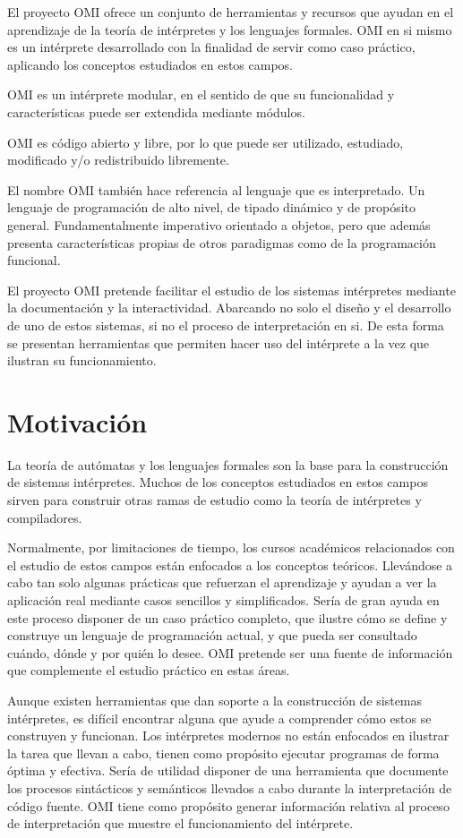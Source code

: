 El proyecto OMI ofrece un conjunto de herramientas y recursos que ayudan en el aprendizaje 
de la teoría de intérpretes y los lenguajes formales. OMI en si mismo es un intérprete desarrollado 
con la finalidad de servir como caso práctico, aplicando los conceptos estudiados en 
estos campos. 

OMI es un intérprete modular, en el sentido de que su funcionalidad y características puede ser extendida mediante módulos. 

OMI es código abierto y libre, por lo que puede ser utilizado, estudiado, modificado y/o redistribuido libremente.

El nombre OMI también hace referencia al lenguaje que es interpretado. Un lenguaje de programación de alto nivel, de tipado dinámico y de propósito general. Fundamentalmente 
imperativo orientado a objetos, pero que además presenta características propias de otros paradigmas como de la programación funcional. 

El proyecto OMI pretende facilitar el estudio de los sistemas intérpretes mediante la documentación y la interactividad. Abarcando no solo el diseño y el desarrollo
de uno de estos sistemas, si no el proceso de interpretación en si. De esta forma se presentan herramientas que permiten hacer uso del intérprete a la vez que ilustran
su funcionamiento. 

\section{Motivación}
La teoría de autómatas y los lenguajes formales son la base para la construcción de sistemas intérpretes. Muchos de los conceptos estudiados 
en estos campos sirven para construir otras ramas de estudio como la teoría de intérpretes y compiladores. 

Normalmente, por limitaciones de tiempo, los cursos académicos relacionados con el estudio de estos campos están enfocados a los conceptos teóricos. 
Llevándose a cabo tan solo algunas prácticas que refuerzan el aprendizaje y ayudan a ver la aplicación real mediante casos sencillos y simplificados. 
Sería de gran ayuda en este proceso disponer de un caso práctico completo, que ilustre cómo se define y construye un lenguaje de programación actual, 
y que pueda ser consultado cuándo, dónde y por quién lo desee. OMI pretende ser una fuente de información que complemente el estudio práctico en estas áreas.

Aunque existen herramientas que dan soporte a la construcción de sistemas intérpretes, es difícil encontrar alguna que ayude a comprender cómo estos se construyen y funcionan. 
Los intérpretes modernos no están enfocados en ilustrar la tarea que llevan a cabo, tienen como propósito ejecutar programas de forma óptima y efectiva. Sería de utilidad disponer de una 
herramienta que documente los procesos sintácticos y semánticos llevados a cabo durante la interpretación de código fuente. OMI tiene como propósito generar información relativa al proceso 
de interpretación que muestre el funcionamiento del intérprete. 

